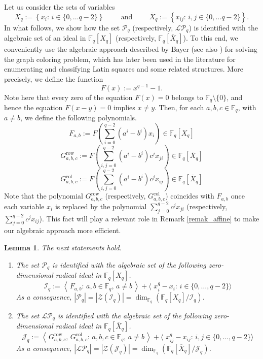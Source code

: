 \documentclass[pdflatex,sn-mathphys-num]{sn-jnl}
\theoremstyle{thmstyleone}%
\newtheorem{lemma}{Lemma}[section]
\begin{document}
Let us consider the sets of variables
\[X_q:=\left\{x_i\colon\, i\in \{0,\ldots q-2\}\right\} \hspace{1cm}\text{and}\hspace{1cm} \overline{X}_q:=\left\{x_{ij}\colon\, i,j\in \{0,\ldots q-2\}\right\}.\]
In what follows, we show how the set $\mathcal{P}_q$ (respectively, $\mathcal{LP}_q$) is identified with the algebraic set of an ideal in $\mathbb{F}_q[X_q]$ (respectively, $\mathbb{F}_q[\overline{X}_q]$). To this end, we conveniently use the algebraic approach described by Bayer \cite{Bayer1982} (see also \cite{Adams1994}) for solving the graph coloring problem, which has later been used in the literature \cite{Falcon2007, Falcon2013, Falcon2015, Falcon2018, Falcon2020} for enumerating and classifying Latin squares and some related structures. More precisely, we define the function
\[F(x):=x^{q-1}-1.\]
Note here that every zero of the equation $F(x)=0$ belongs to $\mathbb{F}_q\setminus\{0\}$, and hence the equation $F(x-y)=0$ implies $x\neq y$. Then, for each $a,b,c\in \mathbb{F}_q$, with $a\neq b$, we define the following polynomials.
\[F_{a,b}:=F\left(\sum_{i=0}^{q-2}(a^i-b^i)x_i\right)\in \mathbb{F}_q[X_q]\]
\[G^{\mathrm{row}}_{a,b,c}:=F\left(\sum_{i,j=0}^{q-2}(a^i-b^i)c^jx_{ji}\right)\in \mathbb{F}_q[\overline{X}_q]\]
\[G^{\mathrm{col}}_{a,b,c}:=F\left(\sum_{i,j=0}^{q-2}(a^i-b^i)c^jx_{ij}\right)\in \mathbb{F}_q[\overline{X}_q]\]
Note that the polynomial $G^{\mathrm{row}}_{a,b,c}$ (respectively, $G^{\mathrm{col}}_{a,b,c}$) coincides with $F_{a,b}$ once each variable $x_i$ is replaced by the polynomial $\sum_{j=0}^{q-2}c^jx_{ji}$ (respectively,  $\sum_{j=0}^{q-2}c^jx_{ij}$). This fact will play a relevant role in Remark \ref{remak_affine} to make our algebraic approach more efficient.

\begin{lemma}\label{lemma_affine} The next statements hold.
\begin{enumerate}
    \item[a)] The set $\mathcal{P}_q$ is identified with the algebraic set of the following zero-dimensional radical ideal in $\mathbb{F}_q[X_q]$.
\[\mathcal{I}_q:=\left\langle\,F_{a,b}\colon\, a,b\in\mathbb{F}_q,\, a\neq b\,\right\rangle + \langle\,\,x_i ^q-x_i\colon\, i\in\{0,\ldots,q-2\}\rangle\] 
As a consequence, $|\mathcal{P}_q|=|\mathcal{Z}(\mathcal{I}_q)|=\dim_{\mathbb{F}_q}(\mathbb{F}_q[X_q]/\mathcal{I}_q)$.

\vspace{0.1cm}

    \item[b)] The set $\mathcal{LP}_q$ is identified with the algebraic set of the following zero-dimensional radical ideal in $\mathbb{F}_q[\overline{X}_q]$.
\[\mathcal{J}_q:= \left\langle\,G^{\mathrm{row}}_{a,b,c},\, G^{\mathrm{col}}_{a,b,c} \colon\, a,b,c\in\mathbb{F}_q,\, a\neq b\,\right\rangle+ \langle\,\,x_{ij} ^q-x_{ij}\colon\, i,j\in\{0,\ldots,q-2\}\rangle\]
As a consequence, $|\mathcal{LP}_q|=|\mathcal{Z}(\mathcal{J}_q)|=\dim_{\mathbb{F}_q}(\mathbb{F}_q[\overline{X}_q]/\mathcal{J}_q)$.
\end{enumerate}
\end{lemma}
\end{document}
